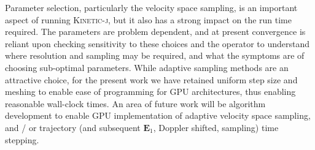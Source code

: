 \documentclass[final,5p,times,twocolumn]{elsarticle}
\renewcommand{\vec}[1]{\mathbf{#1}}
\newcommand{\kj}{\textsc{Kinetic-j}\xspace}
\begin{document}
Parameter selection, particularly the velocity space sampling, is an important aspect of running \kj, but it also has a strong impact on the run time required. The parameters are problem dependent, and at present convergence is reliant upon checking sensitivity to these choices and the operator to understand where resolution and sampling may be required, and what the symptoms are of choosing sub-optimal parameters. While adaptive sampling methods are an attractive choice, for the present work we have retained uniform step size and meshing to enable ease of programming for GPU architectures, thus enabling reasonable wall-clock times. An area of future work will be algorithm development to enable GPU implementation of  adaptive velocity space sampling, and / or trajectory (and subsequent $\vec{E}_{\mathrm{1}}$, Doppler shifted, sampling) time stepping.
\end{document}
